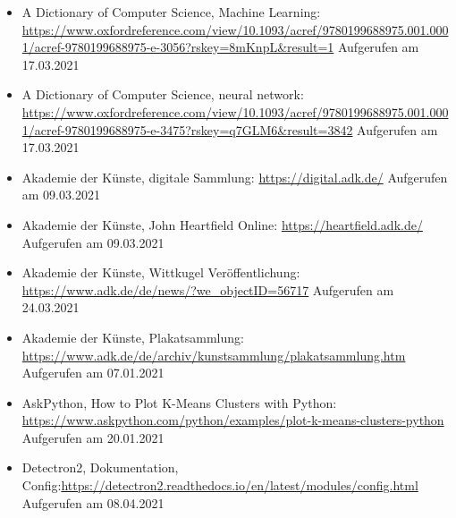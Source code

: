 \documentclass[a4paper,12pt,ngerman]{article}
\begin{document}
\begin{itemize}
\item A Dictionary of Computer Science, Machine Learning: \newline \href{https://www.oxfordreference.com/view/10.1093/acref/9780199688975.001.0001/acref-9780199688975-e-3056?rskey=8mKnpL\&result=1}{https://www.oxfordreference.com/view/10.1093/acref/9780199688975.001.0001/acref-9780199688975-e-3056?rskey=8mKnpL\&result=1} \newline Aufgerufen am 17.03.2021
\item A Dictionary of Computer Science, neural network: \newline \href{https://www.oxfordreference.com/view/10.1093/acref/9780199688975.001.0001/acref-9780199688975-e-3475?rskey=q7GLM6\&result=3842}{https://www.oxfordreference.com/view/10.1093/acref/9780199688975.001.0001/acref-9780199688975-e-3475?rskey=q7GLM6\&result=3842} \newline Aufgerufen am 17.03.2021
\item Akademie der Künste, digitale Sammlung: \newline \href{https://digital.adk.de/}{https://digital.adk.de/} \newline Aufgerufen am 09.03.2021
\item Akademie der Künste, John Heartfield Online: \newline \href{https://heartfield.adk.de/}{https://heartfield.adk.de/} \newline Aufgerufen am 09.03.2021
\item Akademie der Künste, Wittkugel Veröffentlichung: \newline \href{https://www.adk.de/de/news/?we_objectID=56717}{https://www.adk.de/de/news/?we\_objectID=56717} \newline Aufgerufen am 24.03.2021
\item Akademie der Künste, Plakatsammlung: \newline \href{https://www.adk.de/de/archiv/kunstsammlung/plakatsammlung.htm}{https://www.adk.de/de/archiv/kunstsammlung/plakatsammlung.htm} \newline Aufgerufen am 07.01.2021
\item AskPython, How to Plot K-Means Clusters with Python: \newline \href{https://www.askpython.com/python/examples/plot-k-means-clusters-python}{https://www.askpython.com/python/examples/plot-k-means-clusters-python} \newline Aufgerufen am 20.01.2021
\item Detectron2, Dokumentation, Config:\newline \href{https://detectron2.readthedocs.io/en/latest/modules/config.html}{https://detectron2.readthedocs.io/en/latest/modules/config.html} \newline Aufgerufen am 08.04.2021

\end{itemize}
\end{document}
